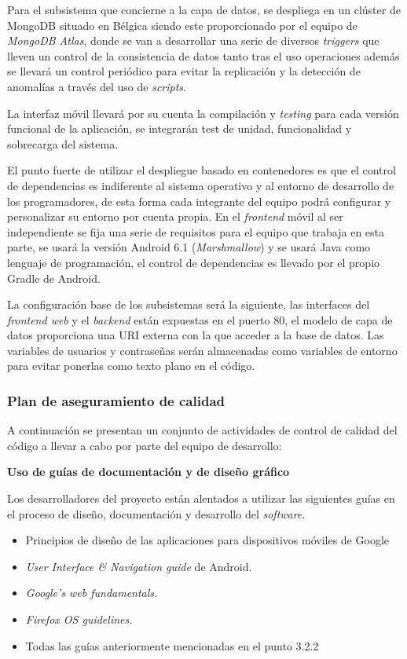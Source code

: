 \documentclass{article}
\begin{document}
Para el subsistema que concierne a la capa de datos, se despliega en un clúster de MongoDB situado en Bélgica siendo este proporcionado por el equipo de \textit{MongoDB Atlas}, donde se van a desarrollar una serie de diversos \textit{triggers} que lleven un control de la consistencia de datos tanto tras el uso operaciones además se llevará un control periódico para evitar la replicación y la detección de anomalías a través del uso de \textit{scripts}.

La interfaz móvil llevará por su cuenta la compilación y \textit{testing} para cada versión funcional de la aplicación, se integrarán test de unidad, funcionalidad y sobrecarga del sistema.

El punto fuerte de utilizar el despliegue basado en contenedores es que el control de dependencias es indiferente al sistema operativo y al entorno de desarrollo de los programadores, de esta forma cada integrante del equipo podrá configurar y personalizar su entorno por cuenta propia. En el \textit{frontend} móvil al ser independiente se fija una serie de requisitos para el equipo que trabaja en esta parte, se usará la versión Android 6.1 (\textit{Marshmallow}) y se usará Java como lenguaje de programación, el control de dependencias es llevado por el propio Gradle de Android.

La configuración base de los subsistemas será la siguiente, las interfaces del \textit{frontend web} y el \textit{backend} están expuestas en el puerto 80, el modelo de capa de datos proporciona una URI externa con la que acceder a la base de datos. Las variables de usuarios y contraseñas serán almacenadas como variables de entorno para evitar ponerlas como texto plano en el código.

\subsubsection{Plan de aseguramiento de calidad} \label{sec:calidad}

A continuación se presentan un conjunto de actividades de control de calidad del código a llevar a cabo por parte del equipo de desarrollo:

\textbf{Uso de guías de documentación y de diseño gráfico}

Los desarrolladores del proyecto están alentados a utilizar las siguientes guías en el proceso de diseño, documentación y desarrollo del \textit{software}.

\begin{itemize}
    \setlength{\itemsep}{0em} %
    \item Principios de diseño de las aplicaciones para dispositivos móviles de Google
    \item \textit{User Interface \& Navigation guide} de Android.
    \item \textit{Google's web fundamentals.}
    \item \textit{Firefox OS guidelines.}
    \item Todas las guías anteriormente mencionadas en el punto 3.2.2
\end{itemize}
\end{document}
